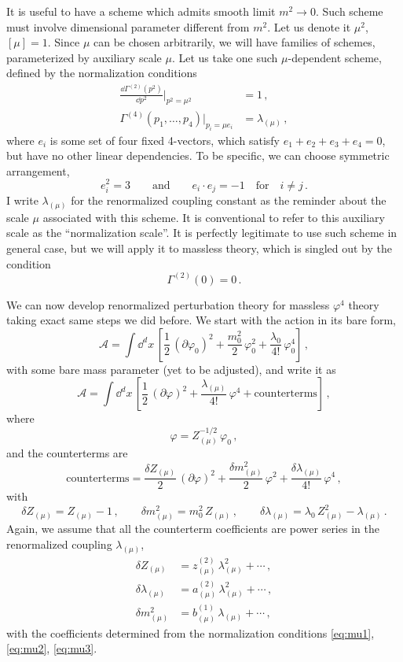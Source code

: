 It is useful to have a scheme which admits smooth limit $m^2\to0$. Such scheme
must involve dimensional parameter different from $m^2$. Let us denote it
$\mu^2$, $[\mu]=1$. Since $\mu$ can be chosen arbitrarily, we will have families
of schemes, parameterized by auxiliary scale $\mu$. Let us take one such
$\mu$-dependent scheme, defined by the normalization conditions
\begin{align}
\frac{\dd\Gamma^{(2)}(p^2)}{\dd p^2}\Big|_{p^2=\mu^2}&=1\,,\label{eq:mu1}\\
\Gamma^{(4)}(p_1,\dots,p_4)\Big|_{p_i=\mu e_i}&=\lambda_{(\mu)}\,,\label{eq:mu2}
\end{align}
where $e_i$ is some set of four fixed 4-vectors, which satisfy
$e_1+e_2+e_3+e_4=0$, but have no other linear dependencies. To be specific, we
can choose symmetric arrangement,
\[
e_i^2=3\qquad\text{and}\qquad e_i\cdot e_j=-1\quad\text{for}\quad i\neq j\,.
\]
I write $\lambda_{(\mu)}$ for the renormalized coupling constant as the reminder
about the scale $\mu$ associated with this scheme. It is conventional to refer to
this auxiliary scale as the ``normalization scale''. It is perfectly legitimate
to use such scheme in general case, but we will apply it to massless theory,
which is singled out by the condition
\begin{equation}\label{eq:mu3}
\Gamma^{(2)}(0)=0\,.
\end{equation}

We can now develop renormalized perturbation theory for massless $\varphi^4$
theory taking exact same steps we did before. We start with the action in its
bare form,
\[
\mathcal A=\int \dd^dx\,\left[\frac12\,(\partial\varphi_0)^2+\frac{m_0^2}2\,\varphi_0^2+\frac{\lambda_0}{4!}\,\varphi_0^4\right]\,,
\]
with some bare mass parameter (yet to be adjusted), and write it as
\[
\mathcal A=\int \dd^dx\,\left[\frac12\,(\partial\varphi)^2+\frac{\lambda_{(\mu)}}{4!}\,\varphi^4+\text{counterterms}\right]\,,
\]
where
\[
\varphi=Z_{(\mu)}^{-1/2}\,\varphi_0\,,
\]
and the counterterms are
\[
\text{counterterms}=\frac{\delta Z_{(\mu)}}2\,(\partial\varphi)^2+\frac{\delta m^2_{(\mu)}}2\,\varphi^2+\frac{\delta\lambda_{(\mu)}}{4!}\,\varphi^4\,,
\]
with
\[
\delta Z_{(\mu)}=Z_{(\mu)}-1\,,\qquad
\delta m^2_{(\mu)}=m_0^2\,Z_{(\mu)}\,,\qquad
\delta\lambda_{(\mu)}=\lambda_0\,Z_{(\mu)}^2-\lambda_{(\mu)}\,.
\]
Again, we assume that all the counterterm coefficients are power series in the
renormalized coupling $\lambda_{(\mu)}$,
\begin{align*}
\delta Z_{(\mu)}&=z^{(2)}_{(\mu)}\,\lambda_{(\mu)}^2+\cdots\,,\\
\delta\lambda_{(\mu)}&=a^{(2)}_{(\mu)}\,\lambda_{(\mu)}^2+\cdots\,,\\
\delta m^2_{(\mu)}&=b^{(1)}_{(\mu)}\,\lambda_{(\mu)}+\cdots\,,
\end{align*}
with the coefficients determined from the normalization conditions
\eqref{eq:mu1}, \eqref{eq:mu2}, \eqref{eq:mu3}.


